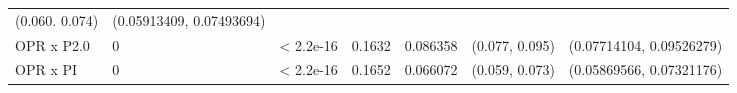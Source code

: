 \documentclass[
]{article}
\begin{document}
\begin{longtable}[]{@{}lllllll@{}}
\begin{minipage}[t]{0.12\columnwidth}
(0.060. 0.074)\strut
\end{minipage} & \begin{minipage}[t]{0.12\columnwidth}\raggedright
(0.05913409, 0.07493694)\strut
\end{minipage}\tabularnewline
\begin{minipage}[t]{0.12\columnwidth}\raggedright
OPR x P2.0\strut
\end{minipage} & \begin{minipage}[t]{0.12\columnwidth}\raggedright
0\strut
\end{minipage} & \begin{minipage}[t]{0.12\columnwidth}\raggedright
\textless{} 2.2e-16\strut
\end{minipage} & \begin{minipage}[t]{0.12\columnwidth}\raggedright
0.1632\strut
\end{minipage} & \begin{minipage}[t]{0.12\columnwidth}\raggedright
0.086358\strut
\end{minipage} & \begin{minipage}[t]{0.12\columnwidth}\raggedright
(0.077, 0.095)\strut
\end{minipage} & \begin{minipage}[t]{0.12\columnwidth}\raggedright
(0.07714104, 0.09526279)\strut
\end{minipage}\tabularnewline
\begin{minipage}[t]{0.12\columnwidth}\raggedright
OPR x PI\strut
\end{minipage} & \begin{minipage}[t]{0.12\columnwidth}\raggedright
0\strut
\end{minipage} & \begin{minipage}[t]{0.12\columnwidth}\raggedright
\textless{} 2.2e-16\strut
\end{minipage} & \begin{minipage}[t]{0.12\columnwidth}\raggedright
0.1652\strut
\end{minipage} & \begin{minipage}[t]{0.12\columnwidth}\raggedright
0.066072\strut
\end{minipage} & \begin{minipage}[t]{0.12\columnwidth}\raggedright
(0.059, 0.073)\strut
\end{minipage} & \begin{minipage}[t]{0.12\columnwidth}\raggedright
(0.05869566, 0.07321176)\strut
\end{minipage}\tabularnewline
\bottomrule
\end{longtable}
\end{document}
